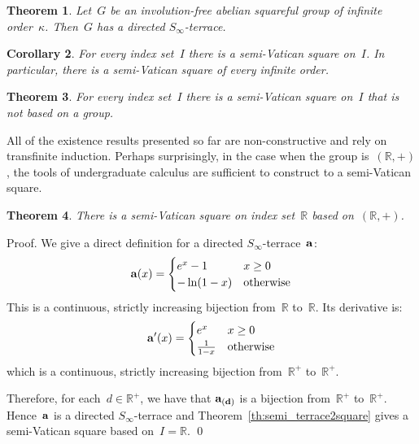 \documentclass[12pt,a4paper]{article}
\newtheorem{thm}{Theorem}[section]
\newtheorem{cor}[thm]{Corollary}
\newcommand{\R}{\mathbb{R}}
\begin{document}
\begin{thm}\label{th:semi_T_infty}
Let~$G$ be an involution-free abelian squareful group of infinite order~$\kappa$.   Then~$G$ has a directed $S_{\infty}$-terrace.
\end{thm}

\begin{cor}\label{cor:semi_vatsquares}
For every index set~$I$ there is a semi-Vatican square on~$I$.  In particular, there is a semi-Vatican square of every infinite order.
\end{cor}

\begin{thm}\label{th:semi_infvat}
For every index set~$I$ there is a semi-Vatican square on~$I$ that is not based on a  group.
\end{thm}

All of the existence results presented so far are non-constructive and rely on transfinite induction.  Perhaps surprisingly, in the case when the group is~$(\R, +)$, the tools of undergraduate calculus are sufficient to construct to a semi-Vatican square.


\begin{thm}\label{th:svr}
There is a semi-Vatican square on index set~$\R$ based on~$(\R,+)$.
\end{thm} 

\noindent
Proof.   We give a direct definition for a directed $S_{\infty}$-terrace~${\bf a}$:
\begin{equation*}
    {\bf a}(x) = \begin{cases}
               e^x   -1            & x \geq 0\\
               -\ln (1-x)       & \text{otherwise}
           \end{cases}
\end{equation*}
This is a continuous, strictly increasing bijection from~$\R$ to~$\R$.  Its derivative is:
\begin{equation*}
    {\bf a}'(x) = \begin{cases}
               e^x               & x \geq 0\\
              \frac{1}{1-x}       & \text{otherwise}
           \end{cases}
\end{equation*}
which is a continuous, strictly increasing bijection from~$\R^+$ to~$\R^+$.

Therefore, for each~$d \in \R^+$, we have that ${\bf a_{(d)}}$ is a bijection from~$\R^+$ to~$\R^+$.  Hence~${\bf a}$ is a directed $S_{\infty}$-terrace and Theorem~\ref{th:semi_terrace2square} gives a semi-Vatican square based on~$I = \R$.
\qed
\end{document}
